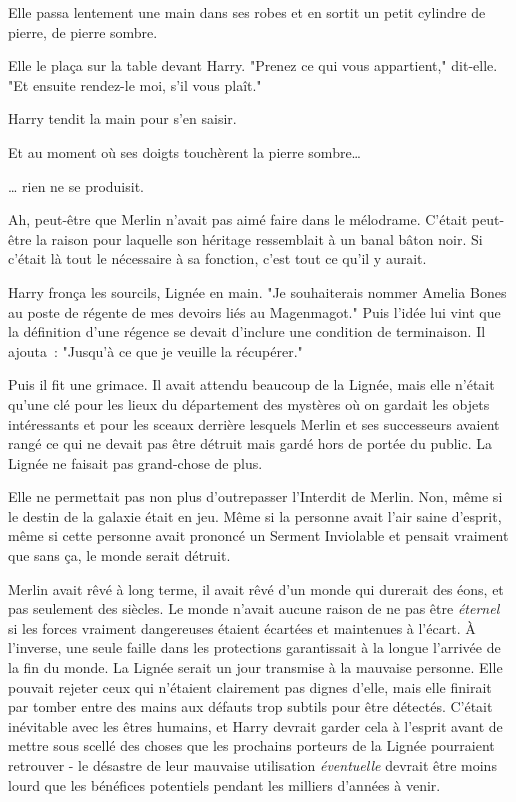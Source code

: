 Elle passa lentement une main dans ses robes et en sortit un petit cylindre de pierre, de pierre sombre.

Elle le plaça sur la table devant Harry. "Prenez ce qui vous appartient," dit-elle. "Et ensuite rendez-le moi, s'il vous plaît."

Harry tendit la main pour s'en saisir.

Et au moment où ses doigts touchèrent la pierre sombre…

… rien ne se produisit.

Ah, peut-être que Merlin n'avait pas aimé faire dans le mélodrame. C'était peut-être la raison pour laquelle son héritage ressemblait à un banal bâton noir. Si c'était là tout le nécessaire à sa fonction, c'est tout ce qu'il y aurait.

Harry fronça les sourcils, Lignée en main. "Je souhaiterais nommer Amelia Bones au poste de régente de mes devoirs liés au Magenmagot." Puis l'idée lui vint que la définition d'une régence se devait d'inclure une condition de terminaison. Il ajouta~: "Jusqu'à ce que je veuille la récupérer."

Puis il fit une grimace. Il avait attendu beaucoup de la Lignée, mais elle n'était qu'une clé pour les lieux du département des mystères où on gardait les objets intéressants et pour les sceaux derrière lesquels Merlin et ses successeurs avaient rangé ce qui ne devait pas être détruit mais gardé hors de portée du public. La Lignée ne faisait pas grand-chose de plus.

Elle ne permettait pas non plus d'outrepasser l'Interdit de Merlin. Non, même si le destin de la galaxie était en jeu. Même si la personne avait l'air saine d'esprit, même si cette personne avait prononcé un Serment Inviolable et pensait vraiment que sans ça, le monde serait détruit.

Merlin avait rêvé à long terme, il avait rêvé d'un monde qui durerait des éons, et pas seulement des siècles. Le monde n'avait aucune raison de ne pas être \emph{éternel} si les forces vraiment dangereuses étaient écartées et maintenues à l'écart. À l'inverse, une seule faille dans les protections garantissait à la longue l'arrivée de la fin du monde. La Lignée serait un jour transmise à la mauvaise personne. Elle pouvait rejeter ceux qui n'étaient clairement pas dignes d'elle, mais elle finirait par tomber entre des mains aux défauts trop subtils pour être détectés. C'était inévitable avec les êtres humains, et Harry devrait garder cela à l'esprit avant de mettre sous scellé des choses que les prochains porteurs de la Lignée pourraient retrouver - le désastre de leur mauvaise utilisation \emph{éventuelle} devrait être moins lourd que les bénéfices potentiels pendant les milliers d'années à venir.

